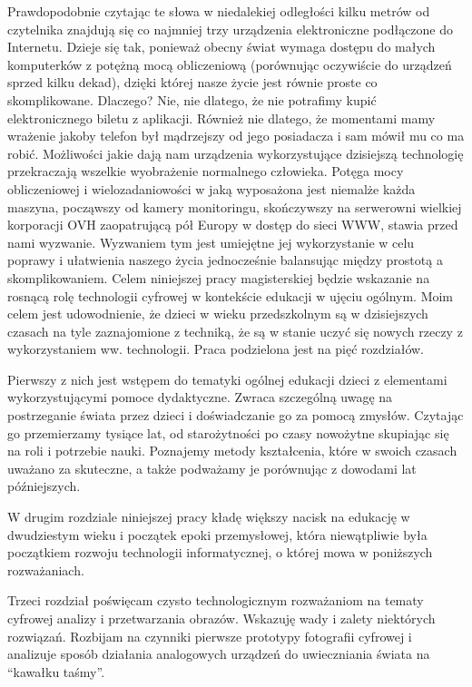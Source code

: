 \documentclass{article}
\begin{document}
	\par
	Prawdopodobnie czytając te słowa w niedalekiej odległości kilku metrów od czytelnika znajdują się co najmniej trzy urządzenia elektroniczne podłączone do Internetu. Dzieje się tak, ponieważ obecny świat wymaga dostępu do małych komputerków z potężną mocą obliczeniową (porównując oczywiście do urządzeń sprzed kilku dekad), dzięki której nasze życie jest równie proste co skomplikowane. Dlaczego? Nie, nie dlatego, że nie potrafimy kupić elektronicznego biletu z aplikacji. Również nie dlatego, że momentami mamy wrażenie jakoby telefon był mądrzejszy od jego posiadacza i sam mówił mu co ma robić. Możliwości jakie dają nam urządzenia wykorzystujące dzisiejszą technologię przekraczają wszelkie wyobrażenie normalnego człowieka. Potęga mocy obliczeniowej i wielozadaniowości w jaką wyposażona jest niemalże każda maszyna, począwszy od kamery monitoringu, skończywszy na serwerowni wielkiej korporacji OVH zaopatrującą pół Europy w dostęp do sieci WWW, stawia przed nami wyzwanie. Wyzwaniem tym jest umiejętne jej wykorzystanie w celu poprawy i ułatwienia naszego życia jednocześnie balansując między prostotą a skomplikowaniem.
	Celem niniejszej pracy magisterskiej będzie wskazanie na rosnącą rolę technologii cyfrowej w kontekście edukacji w ujęciu ogólnym. Moim celem jest udowodnienie, że dzieci w wieku przedszkolnym są w dzisiejszych czasach na tyle zaznajomione z techniką, że są w stanie uczyć się nowych rzeczy z wykorzystaniem ww. technologii. Praca podzielona jest na pięć rozdziałów.
	\par 
	Pierwszy z nich jest wstępem do tematyki ogólnej edukacji dzieci z elementami wykorzystującymi pomoce dydaktyczne. Zwraca szczególną uwagę na postrzeganie świata przez dzieci i doświadczanie go za pomocą zmysłów. Czytając go przemierzamy tysiące lat, od starożytności po czasy nowożytne skupiając się na roli i potrzebie nauki. Poznajemy metody kształcenia, które w swoich czasach uważano za skuteczne, a także podważamy je porównując z dowodami lat późniejszych.
	\par
	W drugim rozdziale niniejszej pracy kładę większy nacisk na edukację w dwudziestym wieku i początek epoki przemysłowej, która niewątpliwie była początkiem rozwoju technologii informatycznej, o której mowa w poniższych rozważaniach.
	\par
	Trzeci rozdział poświęcam czysto technologicznym rozważaniom na tematy cyfrowej analizy i przetwarzania obrazów. Wskazuję wady i zalety niektórych rozwiązań. Rozbijam na czynniki pierwsze prototypy fotografii cyfrowej i analizuje sposób działania analogowych urządzeń do uwieczniania świata na “kawałku taśmy”.
\end{document}
